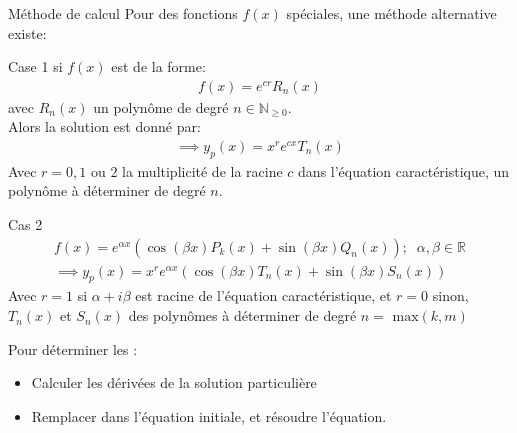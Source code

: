 \begin{parag}{Méthode de calcul}
    Pour des fonctions $f(x)$ spéciales, une méthode alternative existe:
    \begin{subparag}{Case 1}
        si $f(x)$ est de la forme:
        \begin{align*}
            f(x) = e^{cr}R_n(x)
        \end{align*}
        avec $R_n(x)$ un polynôme de degré $n \in \mathbb{N}_{ \geq 0}$.
       \\
       Alors la solution est donné par:
       \begin{align*}
           \implies y_p(x) = x^r e^{cx}T_n(x)
       \end{align*}
       Avec $r = 0, 1$ ou $2$ la multiplicité de la racine $c$ dans l'équation caractéristique,  un polynôme à déterminer de degré $n$.
    \end{subparag}
    \begin{subparag}{Cas 2}
        \begin{align*}
            f(x) = e^{ \alpha x}( \cos ( \beta x) P_k(x) + \sin( \beta x) Q_n(x)); \; \; \alpha, \beta \in \mathbb{R} \\
            \implies y_p(x) = x^r e^{ \alpha x} ( \cos( \beta x ) T_n(x) + \sin ( \beta x ) S_n(x))
        \end{align*}
        Avec $r = 1$ si $ \alpha + i \beta$ est racine de l'équation caractéristique, et $r = 0$ sinon, $T_n(x)$ et $S_n(x)$ des polynômes à déterminer de degré $n = \text{ max}(k, m)$
\end{subparag}
    Pour déterminer les :
    \begin{itemize}
        \item Calculer les dérivées de la solution particulière
        \item Remplacer dans l'équation initiale, et résoudre l'équation.
    \end{itemize}
\end{parag}
